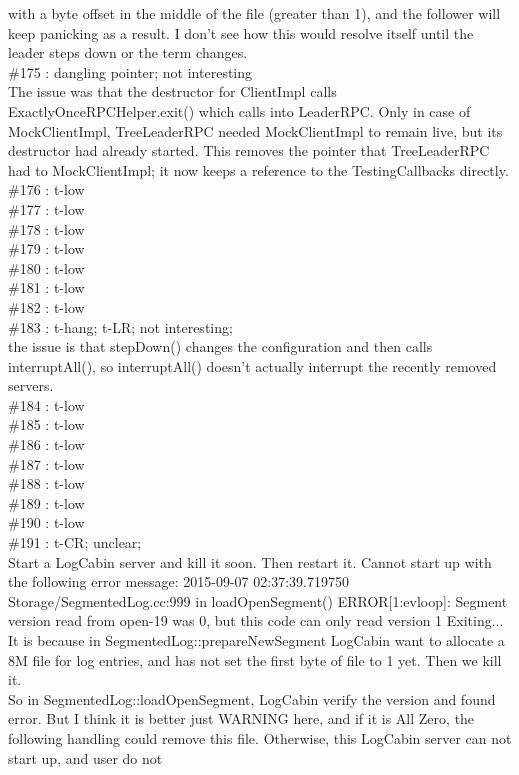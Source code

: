 with a byte offset in the middle of the file (greater than 1), and the 
follower will keep panicking as a result. I don't see how this would 
resolve itself until the leader steps down or the term changes.\\
\#175 : dangling pointer; not interesting\\
The issue was that the destructor for ClientImpl calls
ExactlyOnceRPCHelper.exit() which calls into LeaderRPC. Only in case of
MockClientImpl, TreeLeaderRPC needed MockClientImpl to remain live, but
its destructor had already started. This removes the pointer that
TreeLeaderRPC had to MockClientImpl; it now keeps a reference to the
TestingCallbacks directly.
\#176 : t-low\\
\#177 : t-low\\
\#178 : t-low\\
\#179 : t-low\\
\#180 : t-low\\
\#181 : t-low\\
\#182 : t-low\\
\#183 : t-hang; t-LR; not interesting;\\
the issue is that stepDown() changes the configuration 
and then calls interruptAll(), so interruptAll() doesn't 
actually interrupt the recently removed servers.\\
\#184 : t-low\\
\#185 : t-low\\
\#186 : t-low\\
\#187 : t-low\\
\#188 : t-low\\
\#189 : t-low\\
\#190 : t-low\\
\#191 : t-CR; unclear;\\
Start a LogCabin server and kill it soon. Then restart it. 
Cannot start up with the following error message: 
2015-09-07 02:37:39.719750 Storage/SegmentedLog.cc:999 in 
loadOpenSegment() ERROR[1:evloop]: Segment version read from 
open-19 was 0, but this code can only read version 1 Exiting...\\
It is because in SegmentedLog::prepareNewSegment LogCabin want 
to allocate a 8M file for log entries, and has not set the first 
byte of file to 1 yet. Then we kill it. \\
So in SegmentedLog::loadOpenSegment, LogCabin verify the version 
and found error. But I think it is better just WARNING here, and 
if it is All Zero, the following handling could remove this file. 
Otherwise, this LogCabin server can not start up, and user do not 
